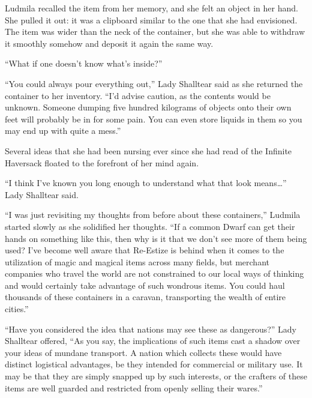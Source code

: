  

Ludmila recalled the item from her memory, and she felt an object in her hand. She pulled it out: it was a clipboard similar to the one that she had envisioned. The item was wider than the neck of the container, but she was able to withdraw it smoothly somehow and deposit it again the same way.

 

“What if one doesn’t know what’s inside?”

 

“You could always pour everything out,” Lady Shalltear said as she returned the container to her inventory. “I’d advise caution, as the contents would be unknown. Someone dumping five hundred kilograms of objects onto their own feet will probably be in for some pain. You can even store liquids in them so you may end up with quite a mess.”

 

Several ideas that she had been nursing ever since she had read of the Infinite Haversack floated to the forefront of her mind again.

 

“I think I’ve known you long enough to understand what that look means…” Lady Shalltear said.

 

“I was just revisiting my thoughts from before about these containers,” Ludmila started slowly as she solidified her thoughts. “If a common Dwarf can get their hands on something like this, then why is it that we don’t see more of them being used? I’ve become well aware that Re-Estize is behind when it comes to the utilization of magic and magical items across many fields, but merchant companies who travel the world are not constrained to our local ways of thinking and would certainly take advantage of such wondrous items. You could haul thousands of these containers in a caravan, transporting the wealth of entire cities.”

 

“Have you considered the idea that nations may see these as dangerous?” Lady Shalltear offered, “As you say, the implications of such items cast a shadow over your ideas of mundane transport. A nation which collects these would have distinct logistical advantages, be they intended for commercial or military use. It may be that they are simply snapped up by such interests, or the crafters of these items are well guarded and restricted from openly selling their wares.”

 

